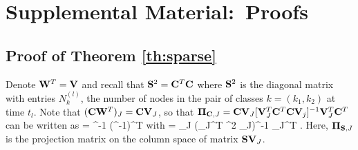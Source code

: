 

\section{Supplemental Material:\ Proofs}
\label{sec:suppl}


\renewcommand{\theequation}{S.\arabic{equation}}
 \setcounter{equation}{0}




 




\subsection{Proof of Theorem \ref{th:sparse} } 

Denote $\mathbf{W}^T = \mathbf{V}$ and recall that $\mathbf{S}^2 = \mathbf{C}^T \mathbf{C}$ where $\mathbf{S}^2$ is the diagonal matrix with entries $N_k^{(l)}$, 
the number of nodes in the pair of classes $k = (k_1, k_2)$ at time $t_l$. 
Note that  $(\mathbf{C} \mathbf{W}^T)_J = \mathbf{C} \mathbf{V}_J$, so that $\PCJ = \bC \bV_J [\bV_J^T \bC^T \bC \bV_j]^{-1} \bV_J^T \bC^T$
can be written as 
\bes 
\PCJ = \bC \bS^{-1} \PSJ (\bC \bS^{-1})^T \quad \mbox{with} \quad \PSJ = \bS \bV_J (\bV_J^T \bS^2 \bV_J)^{-1} \bV_J^T \bS.
\ees
Here, $\PSJ$ is the projection matrix on the column space of matrix $\mathbf{S} \mathbf{V}_J$. 

